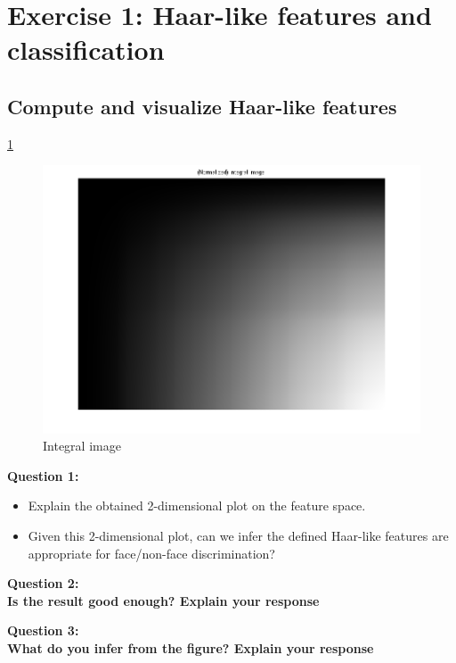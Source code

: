 \section{Exercise 1: Haar-like features and classification}

\subsection{Compute and visualize Haar-like features}

\ref{fig:integralim}

\begin{figure}[htb]
	\centering
		\includegraphics{./img/ex1/integralim.png}
	\caption{Integral image}
	\label{fig:integralim}
\end{figure}


{\bfseries
Question 1:
\begin{itemize}
\item Explain the obtained 2-dimensional plot on the feature space.
\item Given this 2-dimensional plot, can we infer the defined Haar-like features
			are appropriate for face/non-face discrimination?
\end{itemize}}


{\bfseries Question 2: \\Is the result good enough? Explain your response}

{\bfseries Question 3: \\What do you infer from the figure? Explain your response}